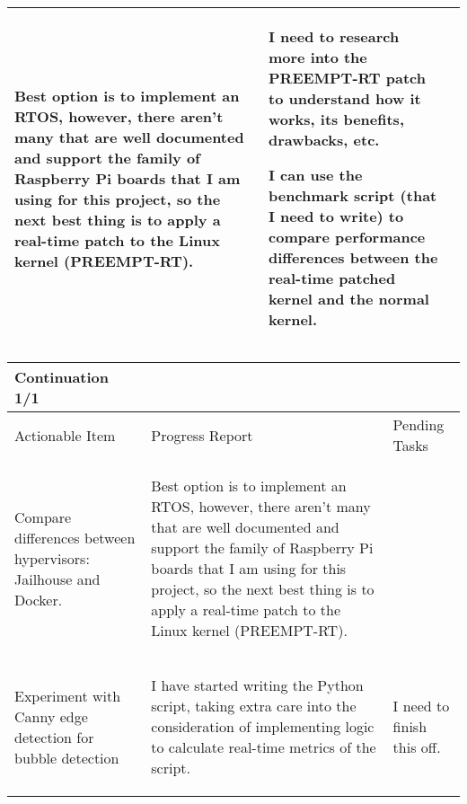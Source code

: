 \begin{table}[!h]
\begin{tabularx}{\textwidth}{|X|X|X|}
\begin{myitemize}
            \item Best option is to implement an RTOS, however, there aren't many that are well documented and support the family of Raspberry Pi boards that I am using for this project, so the next best thing is to apply a real-time patch to the Linux kernel (PREEMPT-RT).
        \end{myitemize} &
        \begin{myitemize}
            \item I need to research more into the PREEMPT-RT patch to understand how it works, its benefits, drawbacks, etc.
            \item I can use the benchmark script (that I need to write) to compare performance differences between the real-time patched kernel and the normal kernel.
        \end{myitemize} \\
        \hline
    \end{tabularx}
\end{table}

\pagebreak

\begin{table}[!h]
    \centering
    \begin{tabularx}{\textwidth}{|X|X|X|}
        \hline
        Continuation 1/1 \\
        \hline
        \hline
        Actionable Item & Progress Report & Pending Tasks \\
        \hline
        \hline
        Compare differences between hypervisors: Jailhouse and Docker. & 
        \begin{myitemize}
            \item Best option is to implement an RTOS, however, there aren't many that are well documented and support the family of Raspberry Pi boards that I am using for this project, so the next best thing is to apply a real-time patch to the Linux kernel (PREEMPT-RT).
        \end{myitemize} &
        \\
        \hline
        Experiment with Canny edge detection for bubble detection & 
        \begin{myitemize}
            \item I have started writing the Python script, taking extra care into the consideration of implementing logic to calculate real-time metrics of the script.
        \end{myitemize} &
        \begin{myitemize}
            \item I need to finish this off.
        \end{myitemize} \\
        \hline
    \end{tabularx}
\end{table}

